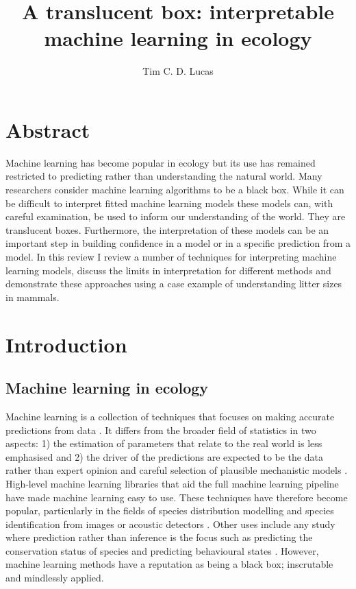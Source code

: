 \documentclass[10pt,]{article}
\title{A translucent box: interpretable machine learning in ecology}
\author{Tim C. D. Lucas}
\date{}
\begin{document}
\maketitle

\section{Abstract}\label{abstract}

Machine learning has become popular in ecology but its use has remained restricted to predicting rather than understanding the natural world.
Many researchers consider machine learning algorithms to be a black box.
While it can be difficult to interpret fitted machine learning models these models can, with careful examination, be used to inform our understanding of the world.
They are translucent boxes.
Furthermore, the interpretation of these models can be an important step in building confidence in a model or in a specific prediction from a model.
In this review I review a number of techniques for interpreting machine learning models, discuss the limits in interpretation for different methods and demonstrate these approaches using a case example of understanding litter sizes in mammals.


\section{Introduction}\label{introduction}

\subsection{Machine learning in ecology}\label{machine-learning-in-ecology}

Machine learning is a collection of techniques that focuses on making accurate predictions from data \citep{crisci2012review, breiman2001statistical}. It differs from the broader field of statistics in two aspects: 1) the estimation of parameters that relate to the real world is less emphasised and 2) the driver of the predictions are expected to be the data rather than expert opinion and careful selection of plausible mechanistic models \citep{breiman2001statistical}. High-level machine learning libraries that aid the full machine learning pipeline \citep{caret, scikit, maxent, biomod} have made machine learning easy to use. These techniques have therefore become popular, particularly in the fields of species distribution modelling \citep{maxent, biomod, elith2006novel, golding2018zoon, gobeyn2019evolutionary} and species identification from images or acoustic detectors \citep{mac2018bat, waldchen2018machine, shamir2014classification, xue2017automatic}. Other uses include any study where prediction rather than inference is the focus such as predicting the conservation status of species \citep{bland2015predicting} and predicting behavioural states \citep{browning2018predicting}. However, machine learning methods have a reputation as being a black box; inscrutable and mindlessly applied.
\end{document}
